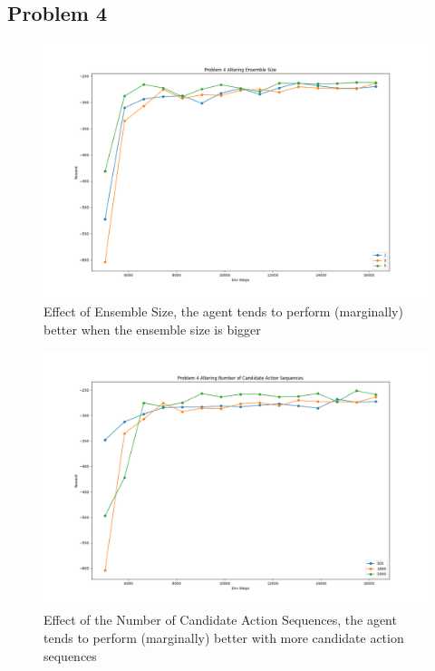 \documentclass[10pt]{report}
\begin{document}
\newpage
\subsection*{Problem 4}
\begin{figure}[h]
	\includegraphics[width=\textwidth]{figures/Problem 4/Problem 4 ensemble.png}
	\caption{Effect of Ensemble Size, the agent tends to perform (marginally) better when the ensemble size is bigger}
\end{figure}
\newpage
\begin{figure}[h]
	\includegraphics[width=\textwidth]{figures/Problem 4/Problem 4 numaction.png}
	\caption{Effect of the Number of Candidate Action Sequences, the agent tends to perform (marginally) better with more candidate action sequences}
\end{figure}
\newpage
\end{document}
